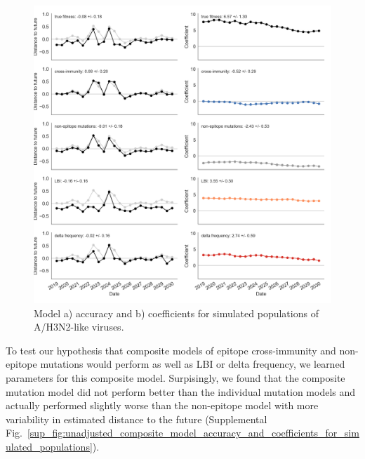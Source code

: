 \begin{figure}[t]
  \begin{center}
  \includegraphics[width=\textwidth]{figures/unadjusted-model-accuracy-and-coefficients-for-simulated-populations.png}
  \caption{Model a) accuracy and b) coefficients for simulated populations of A/H3N2-like viruses.}
  \label{fig:unadjusted_model_accuracy_and_coefficients_for_simulated_populations}
  \end{center}
\end{figure}

To test our hypothesis that composite models of epitope cross-immunity and non-epitope mutations would perform as well as LBI or delta frequency, we learned parameters for this composite model.
Surpisingly, we found that the composite mutation model did not perform better than the individual mutation models and actually performed slightly worse than the non-epitope model with more variability in estimated distance to the future (Supplemental Fig.~\ref{sup_fig:unadjusted_composite_model_accuracy_and_coefficients_for_simulated_populations}).

